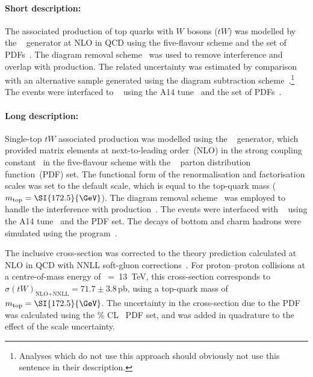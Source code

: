 \paragraph{Short description:}

The associated production of top quarks with $W$ bosons ($tW$) was
modelled by the
\POWHEGBOX[v2]~\cite{Re:2010bp,Nason:2004rx,Frixione:2007vw,Alioli:2010xd}
generator at NLO in QCD using the five-flavour scheme and the
\NNPDF[3.0nlo] set of PDFs~\cite{Ball:2014uwa}.
The diagram removal scheme~\cite{Frixione:2008yi} was used to
remove interference and overlap with \ttbar production. 
The related uncertainty was estimated by comparison with an alternative sample
generated using the diagram subtraction scheme~\cite{Frixione:2008yi,ATL-PHYS-PUB-2016-020}.\footnote{Analyses which do not use this approach 
should obviously not use this sentence in their description.} 
The events were interfaced to \PYTHIA[8.230]~\cite{Sjostrand:2014zea} using the A14
tune~\cite{ATL-PHYS-PUB-2014-021} and the \NNPDF[2.3lo] set of
PDFs~\cite{Ball:2012cx}.




\paragraph{Long description:}

Single-top $tW$ associated production was modelled using the
\POWHEGBOX[v2]~\cite{Re:2010bp,Nason:2004rx,Frixione:2007vw,Alioli:2010xd}
generator, which provided matrix elements at next-to-leading
order~(NLO) in the strong coupling constant \alphas\ in the five-flavour 
scheme with the \NNPDF[3.0nlo]~\cite{Ball:2014uwa} parton
distribution function~(PDF) set.  The functional form of the
renormalisation and factorisation scales was set to the default scale,
which is equal to the top-quark mass ($\mtop = \SI{172.5}{\GeV}$).  
The diagram removal scheme~\cite{Frixione:2008yi} was employed to handle the interference
with \ttbar production~\cite{ATL-PHYS-PUB-2016-020}.  The events were
interfaced with \PYTHIA[8.230]~\cite{Sjostrand:2014zea} using the A14
tune~\cite{ATL-PHYS-PUB-2014-021} and the \NNPDF[2.3lo] PDF set.  The
decays of bottom and charm hadrons were simulated using the
\EVTGEN[1.6.0] program~\cite{Lange:2001uf}.

The inclusive cross-section was corrected to the theory prediction
calculated at NLO in QCD with NNLL soft-gluon
corrections~\cite{Kidonakis:2010ux,Kidonakis:2013zqa}.  For proton--proton
collisions at a centre-of-mass energy of \rts~=~\SI{13}{\TeV}, this
cross-section corresponds to $\sigma(tW)_\text{NLO+NNLL}= 71.7\pm3.8$\,pb,
using a top-quark mass of $\mtop = \SI{172.5}{\GeV}$.  The uncertainty in
the cross-section due to the PDF was calculated using the \%
CL~\cite{Martin:2009iq,Martin:2009bu} PDF set, and was added in
quadrature to the effect of the scale uncertainty.

